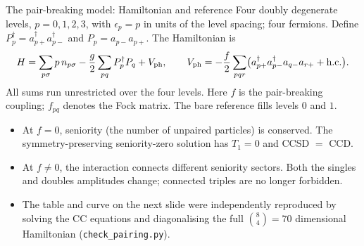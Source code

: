 \documentclass[aspectratio=169,10pt]{beamer}
\newcommand{\cre}[1]{a_{#1}^{\dagger}}
\newcommand{\ann}[1]{a_{#1}}
\begin{document}
\begin{frame}{The pair-breaking model: Hamiltonian and reference}
\small
Four doubly degenerate levels, $p=0,1,2,3$, with $\epsilon_p=p$ in units of the
level spacing; four fermions. Define $P_p^\dagger=\cre{p+}\cre{p-}$ and
$P_p=\ann{p-}\ann{p+}$. The Hamiltonian is
\[
 H=\sum_{p\sigma}p\,n_{p\sigma}-\frac g2\sum_{pq}P_p^\dagger P_q+V_{\rm ph},
 \qquad
 V_{\rm ph}=-\frac f2\sum_{pqr}
 \bigl(\cre{p+}\cre{p-}\ann{q-}\ann{r+}+\text{h.c.}\bigr).
\]
All sums run unrestricted over the four levels. Here $f$ is the pair-breaking
coupling; $f_{pq}$ denotes the Fock matrix. The bare reference fills levels $0$ and $1$.
\begin{itemize}
\item At $f=0$, seniority (the number of unpaired particles) is conserved. The
symmetry-preserving seniority-zero solution has $T_1=0$ and CCSD $=$ CCD.
\item At $f\ne0$, the interaction connects different seniority sectors. Both
the singles and doubles amplitudes change; connected triples are no longer forbidden.
\item The table and curve on the next slide were independently reproduced by
solving the CC equations and diagonalising the full $\binom84=70$ dimensional
Hamiltonian (\texttt{check\_pairing.py}).
\end{itemize}
\end{frame}
\end{document}
